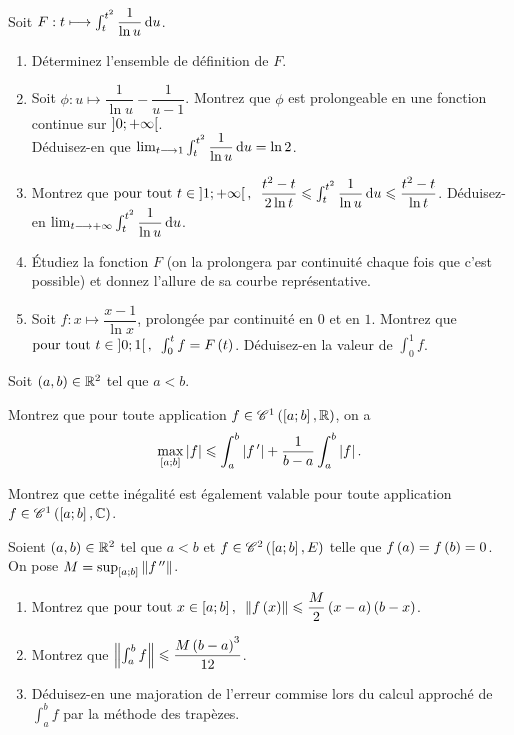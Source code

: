 \begin{exoss}~\\
Soit \(F:t\mapsto\int_t^{t^2}\dfrac{1}{\ln u}\odif{u}\).

\begin{enumerate}
    \item Déterminez l'ensemble de définition de \(F\). \\
    \item Soit \(\phi:u\mapsto\dfrac{1}{\ln u}-\dfrac{1}{u-1}\). Montrez que \(\phi\) est prolongeable en une fonction continue sur \(\left]0;+\infty\right[\). \\ Déduisez-en que \(\lim_{t\to1}\int_t^{t^2}\dfrac{1}{\ln u}\odif{u}=\ln2\). \\
    \item Montrez que \(\quantifs{\tpt t\in\intervee{1}{\pinf}}\dfrac{t^2-t}{2\ln t}\leq\int_t^{t^2}\dfrac{1}{\ln u}\odif{u}\leq\dfrac{t^2-t}{\ln t}\). Déduisez-en \(\lim_{t\to\pinf}\int_t^{t^2}\dfrac{1}{\ln u}\odif{u}\). \\
    \item Étudiez la fonction \(F\) (on la prolongera par continuité chaque fois que c'est possible) et donnez l'allure de sa courbe représentative. \\
    \item Soit \(f:x\mapsto\dfrac{x-1}{\ln x}\), prolongée par continuité en \(0\) et en \(1\). Montrez que \(\quantifs{\tpt t\in\intervee{0}{1}}\int_0^tf=F\paren{t}\). Déduisez-en la valeur de \(\int_0^1f\).
\end{enumerate}
\end{exoss}

\begin{exoss}
Soit \(\left(a,b\right)\in\mathbb{R}^2\) tel que \(a<b\).

Montrez que pour toute application \(f\in\mathscr{C}^{1}\left(\left[a;b\right],\mathbb{R}\right)\), on a \[\max_{\left[a;b\right]}\left\lvert f\right\rvert\leqslant\int_a^b\left\lvert f^{\,\prime}\right\rvert+\dfrac{1}{b-a}\int_a^b\left\lvert f\right\rvert.\]

Montrez que cette inégalité est également valable pour toute application \(f\in\mathscr{C}^{1}\left(\left[a;b\right],\mathbb{C}\right)\).
\end{exoss}

\begin{exoss}
Soient \(\left(a,b\right)\in\mathbb{R}^2\) tel que \(a<b\) et \(f\in\mathscr{C}^{2}\left(\left[a;b\right],E\right)\) telle que \(f\left(a\right)=f\left(b\right)=0\). On pose \(M=\sup_{\intervii{a}{b}}\norme{f\seconde}\).

\begin{enumerate}
    \item Montrez que \(\quantifs{\tpt x\in\intervii{a}{b}}\norme{f\paren{x}}\leq\dfrac{M}{2}\paren{x-a}\paren{b-x}\). \\
    \item Montrez que \(\norme{\int_a^bf}\leq\dfrac{M\paren{b-a}^3}{12}\). \\
    \item Déduisez-en une majoration de l'erreur commise lors du calcul approché de \(\int_a^bf\) par la méthode des trapèzes.
\end{enumerate}
\end{exoss}

